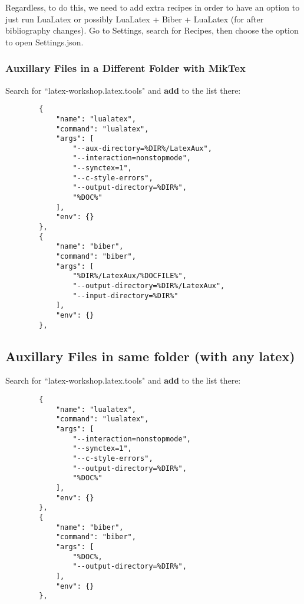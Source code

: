 \documentclass{article}
\begin{document}
Regardless, to do this, we need to add extra recipes in order to have an option to just run LuaLatex or possibly LuaLatex + Biber + LuaLatex (for after bibliography changes).
Go to Settings, search for Recipes, then choose the option to open Settings.json.

\subsubsection{Auxillary Files in a Different Folder with MikTex}
Search for ``latex-workshop.latex.tools" and \textbf{add} to the list there:
\begin{samepage}
    \begin{verbatim}
        {
            "name": "lualatex",
            "command": "lualatex",
            "args": [
                "--aux-directory=%DIR%/LatexAux",
                "--interaction=nonstopmode",
                "--synctex=1",
                "--c-style-errors",
                "--output-directory=%DIR%",
                "%DOC%"
            ],
            "env": {}
        },
        {
            "name": "biber",
            "command": "biber",
            "args": [
                "%DIR%/LatexAux/%DOCFILE%",
                "--output-directory=%DIR%/LatexAux",
                "--input-directory=%DIR%"
            ],
            "env": {}
        },
\end{verbatim}
\end{samepage}
\subsection{Auxillary Files in same folder (with any latex)}
Search for ``latex-workshop.latex.tools" and \textbf{add} to the list there:
\begin{samepage}
    \begin{verbatim}
        {
            "name": "lualatex",
            "command": "lualatex",
            "args": [
                "--interaction=nonstopmode",
                "--synctex=1",
                "--c-style-errors",
                "--output-directory=%DIR%",
                "%DOC%"
            ],
            "env": {}
        },
        {
            "name": "biber",
            "command": "biber",
            "args": [
                "%DOC%,
                "--output-directory=%DIR%",
            ],
            "env": {}
        },
\end{verbatim}
\end{samepage}
\end{document}
